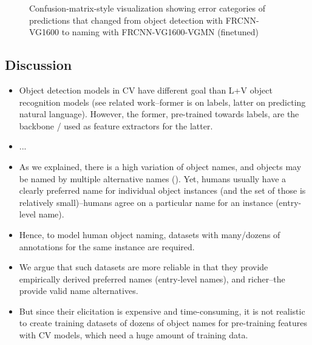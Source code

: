 \begin{figure}[t]
	\caption{Confusion-matrix-style visualization showing error categories of predictions that changed from object detection with FRCNN-VG1600 to naming with FRCNN-VG1600-VGMN (finetuned) \label{fig:exp_confusions}}
\end{figure}


\subsection{Discussion}
\label{sect:exp_discussion}

{}
\begin{itemize}
	\item Object detection models in CV have different goal than L+V object recognition models (see related work--former is on labels, latter on predicting natural language). 
	However, the former, pre-trained towards labels, are the backbone / used as feature extractors for the latter.
	\item ... 
	\item As we explained, there is a high variation of object names, and objects may be named by multiple alternative names (). 
	Yet, humans usually have a clearly preferred name for individual object instances (and the set of those is relatively small)--humans agree on a particular name for an instance (entry-level name).
	\item Hence, to model human object naming, datasets with many/dozens of annotations for the same instance are required. 
	\item We argue that such datasets are more reliable in that they provide empirically derived preferred names (entry-level names), and richer--the provide valid name alternatives. 
	\item But since their elicitation is expensive and time-consuming, it is not realistic to create training datasets of dozens of object names for pre-training features with CV models, which need a huge amount of training data. 
\end{itemize}

